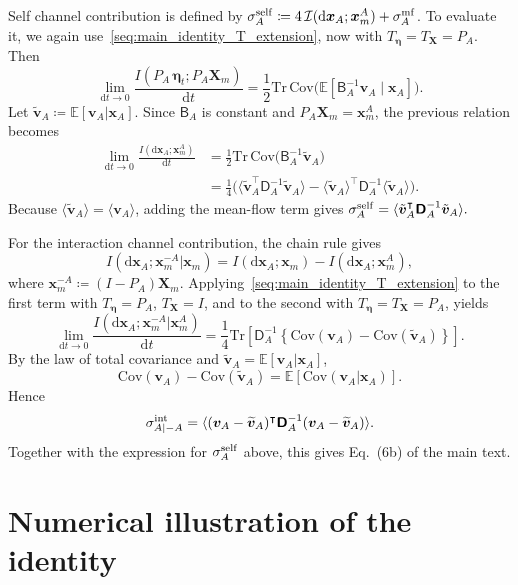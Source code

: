 \documentclass[
 longbibliography,
 twocolumn,
 superscriptaddress,
 amsmath,
 amssymb,
 amsthm,
 amsfonts,
 prl,
 floatfix,
]{revtex4-2}
\newcommand{\matbf}[1]{\boldsymbol{\mathsf{#1}}}
\begin{document}
\begin{widetext}
Self channel contribution is defined by $
    \sigma_A^{\rm self}\coloneq4\,\mathcal I(\mathrm d\bm x_A;\bm x_m^A)+\sigma_A^{\rm mf}$.
To evaluate it, we again use~\eqref{seq:main_identity_T_extension}, now with $T_{\bm\eta}=T_{\bm X}=P_A$.
Then
\[
    \lim_{\mathrm dt\rightarrow0}\frac{I(P_A\,\bm\eta_t;P_A\bm X_m)}{\mathrm dt}
    =\frac{1}{2}\mathrm{Tr}\,\mathrm{Cov}\big(\mathbb E[\matbf B_A^{-1}\bm v_A\mid\bm x_A]\big).
\]
Let $\tilde{\bm v}_A\coloneq\mathbb E[\bm v_A|\bm x_A]$. Since $\matbf B_A$ is constant and $P_A\bm X_m=\bm x_m^A$, the previous relation becomes
\begin{equation*}
    \begin{aligned}
        \lim_{\mathrm dt\rightarrow0}\frac{I(\mathrm d\bm x_A;\bm x_m^A)}{\mathrm dt}
        &=\frac{1}{2}\mathrm{Tr}\,\mathrm{Cov}\big(\matbf B_A^{-1}\tilde{\bm v}_A\big)
        \\
        &=\frac{1}{4}\Big(\langle\tilde{\bm v}_A^\intercal\matbf D_A^{-1}\tilde{\bm v}_A\rangle
        -\langle\tilde{\bm v}_A\rangle^\intercal\matbf D_A^{-1}\langle\tilde{\bm v}_A\rangle\Big).
    \end{aligned}
\end{equation*}
Because $\langle\tilde{\bm v}_A\rangle=\langle\bm v_A\rangle$, adding the mean-flow term gives $
    \sigma_A^{\rm self}=\langle\tilde{\bm v}_A^\intercal\matbf D_A^{-1}\tilde{\bm v}_A\rangle.$

For the interaction channel contribution, the chain rule gives
\[
    I(\mathrm d\bm x_A;\bm x_m^{-A}|\bm x_m)
    =I(\mathrm d\bm x_A;\bm x_m)-I(\mathrm d\bm x_A;\bm x_m^A),
\]
where $\bm x_m^{-A}\coloneq(I-P_A)\bm X_m$. Applying~\eqref{seq:main_identity_T_extension} to the first term with $T_{\bm\eta}=P_A$, $T_{\bm X}=I$, and to the second with $T_{\bm\eta}=T_{\bm X}=P_A$, yields
\[
    \lim_{\mathrm dt\rightarrow0}\frac{I(\mathrm d\bm x_A;\bm x_m^{-A}|\bm x_m^A)}{\mathrm dt}
    =\frac{1}{4}\mathrm{Tr}\left[\matbf D_A^{-1}\left\{\mathrm{Cov}(\bm v_A)-\mathrm{Cov}(\widetilde{\bm v}_A)\right\}\right].
\]
By the law of total covariance and $\widetilde{\bm v}_A=\mathbb E[\bm v_A|\bm x_A]$,
\[
    \mathrm{Cov}(\bm v_A)-\mathrm{Cov}(\widetilde{\bm v}_A)
    =\mathbb E[\mathrm{Cov}(\bm v_A|\bm x_A)].
\]
Hence
\[
    \sigma_{A|-A}^{\rm int}=\langle(\bm v_A-\widetilde{\bm v}_A)^\intercal\matbf D_A^{-1}(\bm v_A-\widetilde{\bm v}_A)\rangle.
\]
Together with the expression for $\sigma_A^{\rm self}$ above, this gives Eq.~(6b) of the main text.

\section{Numerical illustration of the identity}
\vspace*{-0.6\baselineskip}


\end{widetext}
\end{document}
